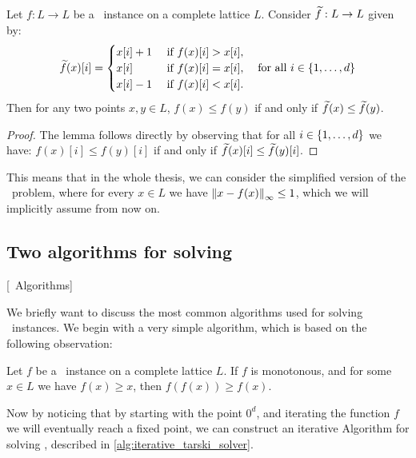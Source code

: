 \begin{lemma}
    Let $f : L \rightarrow L$ be a \Tarski\ instance on a complete lattice $L$. Consider $\widetilde{f} : L \rightarrow L$ given by: 
    \begin{align*}
        \widetilde{f}(x)[i] = \begin{cases}
                            x[i] + 1 & \text{ if } f(x)[i] > x[i], \\
                            x[i]     & \text{ if } f(x)[i] = x[i], \\
                            x[i] - 1 & \text{ if } f(x)[i] < x[i].
                        \end{cases} \quad \text{for all $i \in \left\{1, \dots, d\right\}$}
    \end{align*}
    Then for any two points $x, y \in L$, $f(x) \leq f(y)$ if and only if $\widetilde{f}(x) \leq \widetilde{f}(y)$.
\end{lemma}
\begin{proof}
    The lemma follows directly by observing that for all $i \in \left\{1, \dots, d\right\}$ we have: $f(x)[i] \leq f(y)[i]$ if and only if $\widetilde{f}(x)[i] \leq \widetilde{f}(y)[i]$.
\end{proof}
This means that in the whole thesis, we can consider the simplified version of the \Tarski\ problem, where for every $x \in L$ we have $\left\lVert x - f(x)\right\rVert_{\infty} \leq 1$, which we will implicitly assume from now on.

\subsection{Two algorithms for solving \Tarski}[\Tarski\ Algorithms]

We briefly want to discuss the most common algorithms used for solving \Tarski\ instances. We begin with a very simple algorithm, which is based on the following observation:
\begin{remark}
    Let $f$ be a \Tarski\ instance on a complete lattice $L$. If $f$ is monotonous, and for some $x \in L$ we have $f(x) \geq x$, then $f(f(x)) \geq f(x)$.
\end{remark}
Now by noticing that by starting with the point $0^d$, and iterating the function $f$ we will eventually reach a fixed point, we can construct an iterative Algorithm for solving \Tarski, described in \cref{alg:iterative_tarski_solver}.

